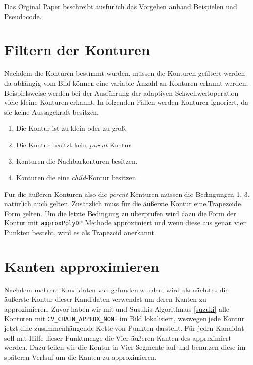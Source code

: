 Das Orginal Paper \cite{journals/cvgip/SuzukiA85} beschreibt ausfürlich das Vorgehen anhand Beispielen und Pseudocode.

\section{Filtern der Konturen}
Nachdem die Konturen bestimmt wurden, müssen die Konturen gefiltert werden da abhängig vom Bild können eine variable Anzahl an Konturen
erkannt werden. Beispielsweise werden bei der Ausführung der adaptiven Schwellwertoperation viele kleine Konturen erkannt. In folgenden Fällen werden Konturen ignoriert, da sie keine Aussagekraft besitzen.
\begin{enumerate}
	\item Die Kontur ist zu klein oder zu groß.
	\item Die Kontur besitzt kein \emph{parent}-Kontur.
	\item Konturen die Nachbarkonturen besitzen.
	\item Konturen die eine \emph{child}-Kontur besitzen.
\end{enumerate}
Für die äußeren Konturen also die \emph{parent}-Konturen müssen die Bedingungen 1.-3. natürlich auch gelten. Zusätzlich muss für die äußerste Kontur eine Trapezoide Form gelten. Um die letzte Bedingung zu überprüfen wird dazu die Form der Kontur mit \texttt{approxPolyDP} Methode approximiert und wenn diese aus genau vier Punkten besteht, wird es als Trapezoid anerkannt.

\section{Kanten approximieren}
Nachdem mehrere Kandidaten von \fps gefunden wurden, wird als nächstes die äußerste Kontur dieser Kandidaten verwendet um deren Kanten zu approximieren. Zuvor haben wir mit \OpenCV und Suzukis Algorithmus \ref{suzuki} alle Konturen mit \texttt{CV\_CHAIN\_APPROX\_NONE} im Bild lokalisiert, weswegen jede Kontur jetzt eine zusammenhängende Kette von Punkten darstellt. Für jeden Kandidat soll mit Hilfe dieser Punktmenge die Vier äußeren Kanten des \fps approximiert werden. Dazu teilen wir die Kontur in Vier Segmente auf und benutzen diese im späteren Verlauf um die Kanten zu approximieren.

